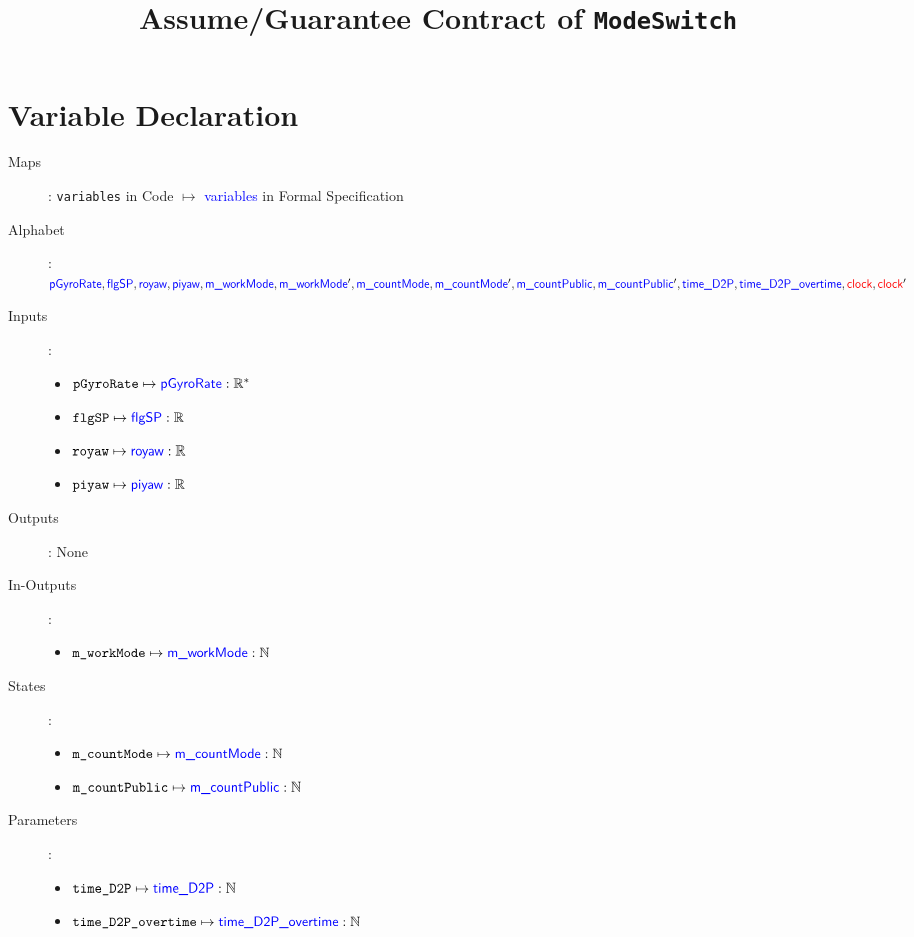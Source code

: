 \documentclass[fleqn,a4paper]{article}
\newcommand\var[1]{\texttt{#1}}
\newcommand\Var[1]{\textcolor{blue}{\textsf{#1}}}
\newcommand\clock{\textcolor{red}{\textsf{clock}}}
\begin{document}
\title{Assume/Guarantee Contract of \texttt{ModeSwitch}}
\author{}

\maketitle

\section{Variable Declaration}

\begin{description}
\item[Maps]:
\var{variables} in Code $\mapsto$ \Var{variables} in Formal Specification

\item[Alphabet]: \\
$\Var{pGyroRate},
\Var{flgSP},
\Var{royaw},
\Var{piyaw},
\Var{m\_workMode},
\Var{m\_workMode}',
\Var{m\_countMode},
\Var{m\_countMode}', \\
\Var{m\_countPublic},
\Var{m\_countPublic}',
\Var{time\_D2P},
\Var{time\_D2P\_overtime},
\clock,
\clock'$

\item[Inputs]:
\begin{itemize}
\item $\var{pGyroRate} \mapsto \Var{pGyroRate} : \mathbb{R^*}$
\item $\var{flgSP} \mapsto \Var{flgSP} : \mathbb{R}$
\item $\var{royaw} \mapsto \Var{royaw} : \mathbb{R}$
\item $\var{piyaw} \mapsto \Var{piyaw} : \mathbb{R}$
\end{itemize}

\item[Outputs]: None

\item[In-Outputs]:
\begin{itemize}
\item $\var{m\_workMode} \mapsto \Var{m\_workMode} : \mathbb{N}$
\end{itemize}

\item[States]:
\begin{itemize}
\item $\var{m\_countMode} \mapsto \Var{m\_countMode} : \mathbb{N}$
\item $\var{m\_countPublic} \mapsto \Var{m\_countPublic} : \mathbb{N}$
\end{itemize}

\item[Parameters]: 
\begin{itemize}
\item $\var{time\_D2P} \mapsto \Var{time\_D2P} : \mathbb{N}$
\item $\var{time\_D2P\_overtime} \mapsto \Var{time\_D2P\_overtime} : \mathbb{N}$
\end{itemize}

\end{description}
\end{document}

